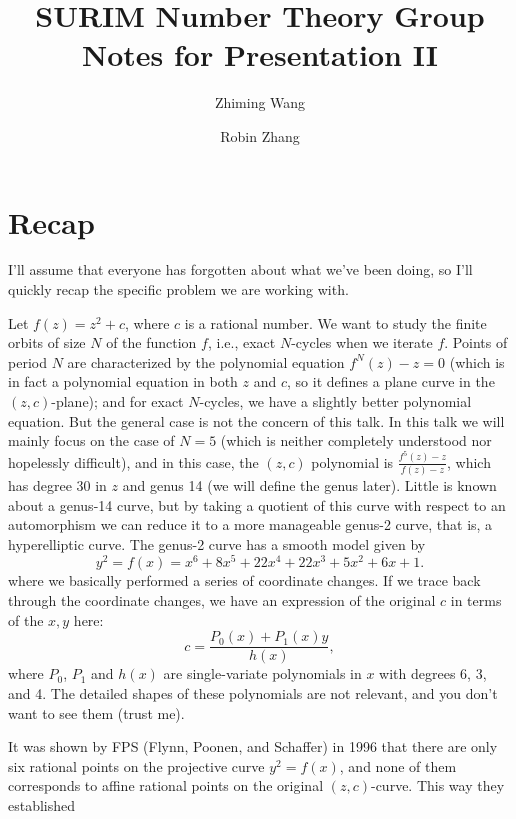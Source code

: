 

\title{SURIM Number Theory Group\\Notes for Presentation II}

\author{Zhiming Wang}
\author{Robin Zhang}



\maketitle

\section{Recap}

I'll assume that everyone has forgotten about what we've been doing,
so I'll quickly recap the specific problem we are working with.

Let $f(z) = z^2 + c$, where $c$ is a rational number. We want to study
the finite orbits of size $N$ of the function $f$, i.e., exact
$N$-cycles when we iterate $f$. Points of period $N$ are characterized
by the polynomial equation $f^N(z) - z = 0$ (which is in fact a
polynomial equation in both $z$ and $c$, so it defines a plane curve
in the $(z, c)$-plane); and for exact $N$-cycles, we have a slightly
better polynomial equation. But the general case is not the concern of
this talk. In this talk we will mainly focus on the case of $N = 5$
(which is neither completely understood nor hopelessly difficult), and
in this case, the $(z, c)$ polynomial is $\frac{f^5(z) - z}{f(z) -
  z}$, which has degree 30 in $z$ and genus 14 (we will define the
genus later). Little is known about a genus-14 curve, but by taking a
quotient of this curve with respect to an automorphism we can reduce
it to a more manageable genus-2 curve, that is, a hyperelliptic
curve. The genus-2 curve has a smooth model given by
\[
y^2 = f(x) = x^6 + 8x^5 + 22x^4 + 22x^3 + 5x^2 + 6x + 1.
\]
where we basically performed a series of coordinate changes. If we
trace back through the coordinate changes, we have an expression of
the original $c$ in terms of the $x, y$ here:
\[
c = \frac{P_0(x) + P_1(x) y}{h(x)},
\]
where $P_0$, $P_1$ and $h(x)$ are single-variate polynomials in $x$
with degrees 6, 3, and 4. The detailed shapes of these polynomials are
not relevant, and you don't want to see them (trust me).

It was shown by FPS (Flynn, Poonen, and Schaffer) in 1996 that there
are only six rational points on the projective curve $y^2 = f(x)$, and
none of them corresponds to affine rational points on the original
$(z, c)$-curve. This way they established

